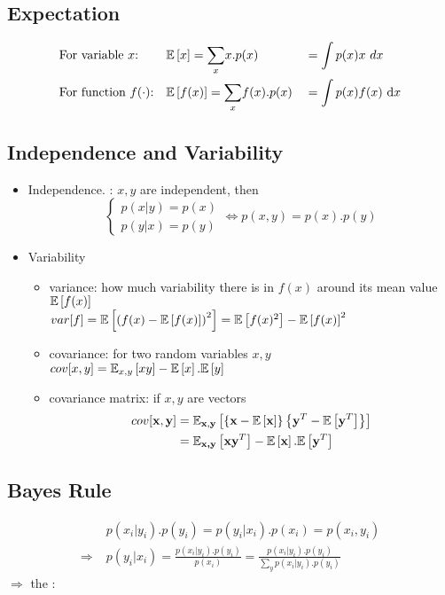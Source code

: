 \subsection{Expectation}
\label{subsec:expectation}
\begin{align*}
	& \text{For variable $x$:} && \mathbb{E} \left[ x \right] = \underset{x}{\sum}x.p(x) && = \int p(x)x\text\ {d}x \\
	& \text{For function $f(\cdot)$:} && \mathbb{E} \left[ f(x) \right] = \underset{x}{\sum}f(x).p(x) && = \int p(x)f(x)\ \text{d}x
\end{align*}

\subsection{Independence and Variability}
\begin{itemize}
	\item Independence. \Eg: $x, y$ are independent, then
	\[\begin{cases}
		p(x|y) = p(x)\\
		p(y|x) = p(y)
	\end{cases}
	\Leftrightarrow p(x,y) = p(x).p(y)\]	
	\item Variability
	\begin{itemize}
		\item variance: how much variability there is in $f(x)$ around its mean value $\mathbb{E} \left[ f(x) \right]$\\
		$var [f] = \mathbb{E} \left[ \left(f(x)-\mathbb{E} \left[ f(x) \right]\right)^2 \right] = \mathbb{E} \left[ f(x)^2 \right] - \mathbb{E} \left[ f(x) \right]^2$
		\item covariance: for two random variables $x, y$\\
		$cov [x, y] = \mathbb{E}_{x,y}\left[xy\right] - \mathbb{E} \left[ x \right].\mathbb{E} \left[ y \right]$
		\item covariance matrix: if $x, y$ are vectors
		\begin{align*}
			cov [\textbf{x}, \textbf{y}] &= \mathbb{E}_{\textbf{x},\textbf{y}} \left[ \left\{\textbf{x}-\mathbb{E} \left[ \textbf{x} \right]\right\} \left\{\textbf{y}^T -  \mathbb{E} \left[ \textbf{y}^T \right] \right\} \right]\\
			&= \mathbb{E}_{\textbf{x,y}}\left[\textbf{xy}^T\right] - \mathbb{E} \left[ \textbf{x} \right].\mathbb{E} \left[ \textbf{y}^T \right]
		\end{align*}
	\end{itemize}
\end{itemize}

\subsection{Bayes Rule}
\label{subsec:bayes-rule}
\begin{align*}
	& p(x_i|y_i).p(y_i) = p(y_i|x_i).p(x_i) = p(x_i, y_i) \\
	\Rightarrow\; &p(y_i|x_i) = \frac{p(x_i|y_i).p(y_i)}{p(x_i)} = \frac{p(x_i|y_i).p(y_i)}{\underset{y}{\sum} p(x_i|y_i).p(y_i)}
\end{align*}
$\Rightarrow$ the :

